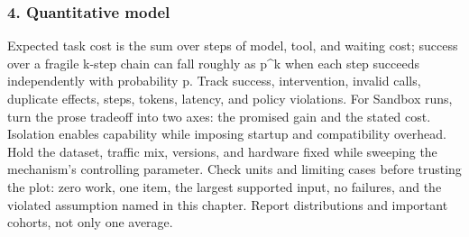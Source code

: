 \subsubsection*{4. Quantitative model}
Expected task cost is the sum over steps of model, tool, and waiting cost; success over a fragile k-step chain can fall roughly as p\textasciicircum{}k when each step succeeds independently with probability p. Track success, intervention, invalid calls, duplicate effects, steps, tokens, latency, and policy violations.
For Sandbox runs, turn the prose tradeoff into two axes: the promised gain and the stated cost. Isolation enables capability while imposing startup and compatibility overhead. Hold the dataset, traffic mix, versions, and hardware fixed while sweeping the mechanism's controlling parameter.
Check units and limiting cases before trusting the plot: zero work, one item, the largest supported input, no failures, and the violated assumption named in this chapter. Report distributions and important cohorts, not only one average.
